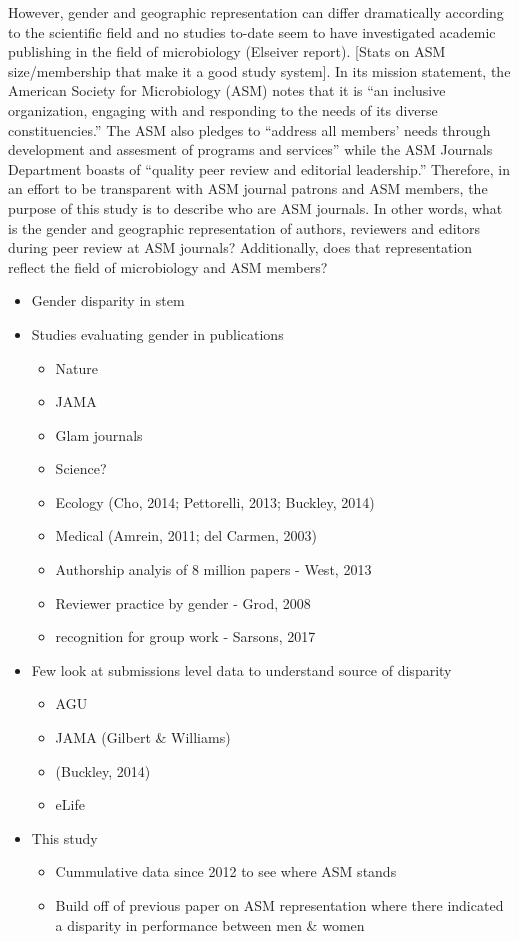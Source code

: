 \documentclass[11pt,]{article}
\providecommand{\tightlist}{%
  \setlength{\itemsep}{0pt}\setlength{\parskip}{0pt}}
\begin{document}
However, gender and geographic representation can differ dramatically
according to the scientific field and no studies to-date seem to have
investigated academic publishing in the field of microbiology (Elseiver
report). {[}Stats on ASM size/membership that make it a good study
system{]}. In its mission statement, the American Society for
Microbiology (ASM) notes that it is ``an inclusive organization,
engaging with and responding to the needs of its diverse
constituencies.'' The ASM also pledges to ``address all members' needs
through development and assesment of programs and services'' while the
ASM Journals Department boasts of ``quality peer review and editorial
leadership.'' Therefore, in an effort to be transparent with ASM journal
patrons and ASM members, the purpose of this study is to describe who
are ASM journals. In other words, what is the gender and geographic
representation of authors, reviewers and editors during peer review at
ASM journals? Additionally, does that representation reflect the field
of microbiology and ASM members?

\begin{itemize}
\item
  Gender disparity in stem
\item
  Studies evaluating gender in publications

  \begin{itemize}
  \tightlist
  \item
    Nature
  \item
    JAMA
  \item
    Glam journals
  \item
    Science?
  \item
    Ecology (Cho, 2014; Pettorelli, 2013; Buckley, 2014)
  \item
    Medical (Amrein, 2011; del Carmen, 2003)
  \item
    Authorship analyis of 8 million papers - West, 2013
  \item
    Reviewer practice by gender - Grod, 2008
  \item
    recognition for group work - Sarsons, 2017
  \end{itemize}
\item
  Few look at submissions level data to understand source of disparity

  \begin{itemize}
  \tightlist
  \item
    AGU
  \item
    JAMA (Gilbert \& Williams)
  \item
    (Buckley, 2014)
  \item
    eLife
  \end{itemize}
\item
  This study

  \begin{itemize}
  \tightlist
  \item
    Cummulative data since 2012 to see where ASM stands
  \item
    Build off of previous paper on ASM representation where there
    indicated a disparity in performance between men \& women
  \end{itemize}
\end{itemize}
\end{document}
